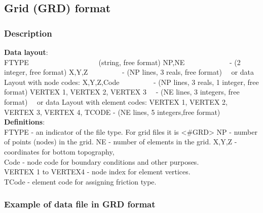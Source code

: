 \documentclass{article}
\begin{document}
\newpage
\subsection[Grid (GRD) format]{Grid (GRD) format}
\subsubsection[Description]{Description}

\textbf{Data layout}: \\ 

\noindent
FTYPE \ \ \ \ \ \ \ \ \ \ \ \ \ \ \ \ \ \ \ (string, free format) \newline
NP,NE \ \ \ \ \ \ \ \ \ \ \ \ {}- (2 integer, free format)\newline
X,Y,Z \ \ \ \ \ \ \ \ \ {}- (NP lines, 3 reals, free format)\newline
\ \ or data Layout with node codes:\newline
X,Y,Z,Code \ \ \ \ \ \ \ \ \ {}- (NP lines, 3 reals, 1 integer, free format)\newline
VERTEX 1, VERTEX 2, VERTEX 3 \ \ {}- (NE lines, 3 integers, free format)\newline
\ \ or data Layout with element codes:\newline
VERTEX 1, VERTEX 2, VERTEX 3, VERTEX 4, TCODE - (NE lines, 5 integers,free format) \\

\noindent\textbf{Definitions}:\\ 

\noindent
FTYPE - an indicator of the file type.  For grid files it is <\#GRD> \newline
NP - number of points (nodes) in the grid.\newline
NE - number of elements in the grid.\newline
X,Y,Z - coordinates for bottom topography, \\
Code - node code for boundary conditions and other purposes. \\
VERTEX 1 to VERTEX4 - node index for element vertices. \\
TCode - element code for assigning friction type.  \\

\subsubsection{Example of data file in GRD format}
\end{document}
